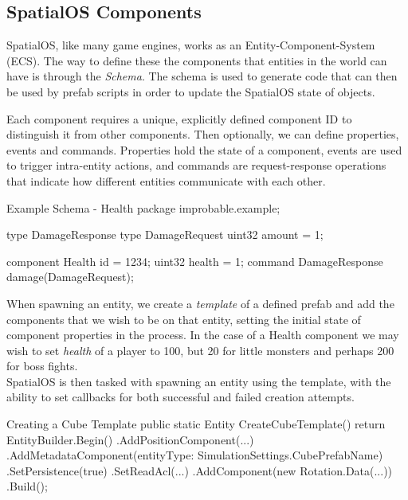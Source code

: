 \documentclass[a4paper,11pt,titlepage]{report}
\begin{document}
\subsection{SpatialOS Components}
SpatialOS, like many game engines, works as an Entity-Component-System (ECS). The way to define these the components that entities in the world can have is through the \textit{Schema}. The schema is used to generate code that can then be used by prefab scripts in order to update the SpatialOS state of objects.

\clearpage
Each component requires a unique, explicitly defined component ID to distinguish it from other components. Then optionally, we can define properties, events and commands. Properties hold the state of a component, events are used to trigger intra-entity actions, and commands are request-response operations that indicate how different entities communicate with each other.\\

\begin{sexylisting}[colback=white]{Example Schema - Health}
package improbable.example;

type DamageResponse {}
type DamageRequest {
  uint32 amount = 1;
}

component Health {
  id = 1234;
  uint32 health = 1;
  command DamageResponse damage(DamageRequest);
}
\end{sexylisting}

When spawning an entity, we create a \textit{template} of a defined prefab and add the components that we wish to be on that entity, setting the initial state of component properties in the process. In the case of a Health component we may wish to set \textit{health} of a player to 100, but 20 for little monsters and perhaps 200 for boss fights.\\

SpatialOS is then tasked with spawning an entity using the template, with the ability to set callbacks for both successful and failed creation attempts.\\

\begin{sexylisting}[colback=white]{Creating a Cube Template}
public static Entity CreateCubeTemplate()
{
  return EntityBuilder.Begin()
    .AddPositionComponent(...)
    .AddMetadataComponent(entityType: SimulationSettings.CubePrefabName)
    .SetPersistence(true)
    .SetReadAcl(...)
    .AddComponent(new Rotation.Data(...))
    .Build();
}
\end{sexylisting}
\end{document}
